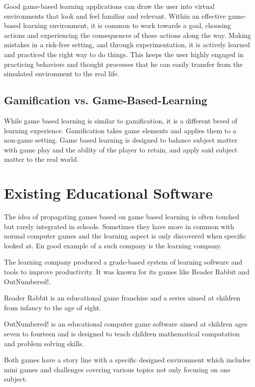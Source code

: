 Good game-based learning applications can draw the user into virtual environments that look and feel familiar and relevant.
Within an effective game-based learning environment, it is common to work towards a goal,
choosing actions and experiencing the consequences of those actions along the way.
Making mistakes in a risk-free setting, and through experimentation,
it is actively learned and practiced the right way to do things.
This keeps the user highly engaged in practicing behaviors and thought processes that he can easily transfer from the
simulated environment to the real life\cite{gal}.

\subsection{Gamification vs. Game-Based-Learning}\label{subsec:gamification-vs.-game-based-learning}
While game based learning is similar to gamification, it is a different breed of learning experience.
Gamification takes game elements and applies them to a non-game setting.
Game based learning is designed to balance subject matter with game play and the ability of the player to retain,
and apply said subject matter to the real world.

\section{Existing Educational Software}\label{sec:existing-educational-software}
The idea of propagating games based on game based learning is often touched but rarely integrated in schools.
Sometimes they have more in common with normal computer games and the learning aspect is only discovered when specific looked at.
En good example of a such company is the learning company\cite{tlc}.

The learning company produced a grade-based system of learning software and tools to improve productivity.
It was known for its games like Reader Rabbit\cite{readerrabbit} and OutNumbered!\cite{outnumbered}.

Reader Rabbit is an educational game franchise and a series aimed at children from infancy to the age of eight.

OutNumbered! is an educational computer game software aimed at children ages seven to fourteen and
is designed to teach children mathematical computation and problem solving skills.

Both games have a story line with a specific designed environment which includes mini games and challenges covering
various topics not only focusing on one subject.

